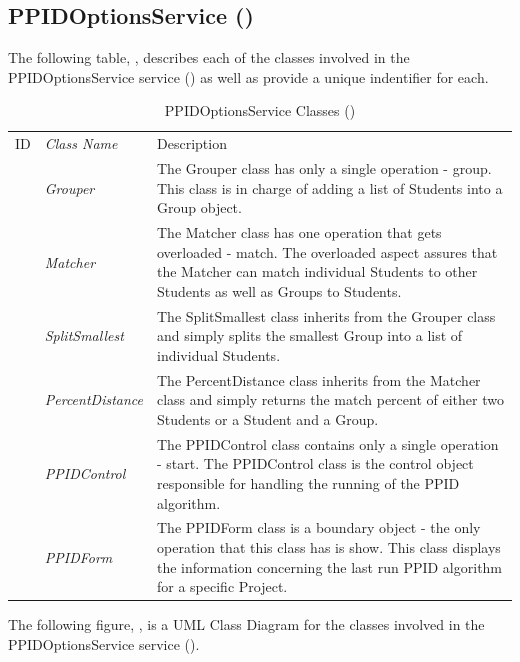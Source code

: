 \documentclass[12pt,letterpaper]{article}
\begin{document}
\subsection{PPIDOptionsService ()}

The following table, , describes each of the classes involved in the PPIDOptionsService service () as well as provide a unique indentifier for each.

\begin{table}[H]
	\caption{PPIDOptionsService Classes ()} 
	\begin{tabu} to 
	    \tableheader{}ID & Class Name & Description \\
		 & Grouper & The Grouper class has only a single operation - group. This class is in charge of adding a list of Students into a Group object.\\
		 & Matcher & The Matcher class has one operation that gets overloaded - match. The overloaded aspect assures that the Matcher can match individual Students to other Students as well as Groups to Students.\\
		 & SplitSmallest & The SplitSmallest class inherits from the Grouper class and simply splits the smallest Group into a list of individual Students.\\
		 & PercentDistance & The PercentDistance class inherits from the Matcher class and simply returns the match percent of either two Students or a Student and a Group.\\
		 & PPIDControl & The PPIDControl class contains only a single operation - start. The PPIDControl class is the control object responsible for handling the running of the PPID algorithm.\\
		 & PPIDForm & The PPIDForm class is a boundary object - the only operation that this class has is show. This class displays the information concerning the last run PPID algorithm for a specific Project.\\
	\end{tabu}
\end{table}

The following figure, , is a UML Class Diagram for the classes involved in the PPIDOptionsService service ().
\end{document}
